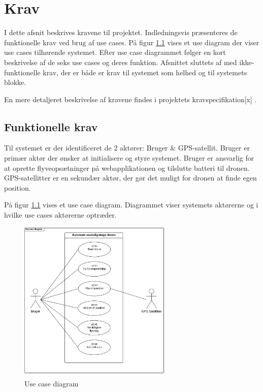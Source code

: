 \chapter{Krav}
\vspace{-0.5cm}
I dette afsnit beskrives kravene til projektet. Indledningsvis præsenteres de funktionelle krav  ved brug af use cases. På figur \ref{fig:useCaseDiagram} vises et use diagram der viser use cases tilhørende systemet. Efter use case diagrammet følger en kort beskrivelse af de seks use cases og deres funktion. Afsnittet sluttets af med ikke-funktionelle krav, der er både er krav til systemet som helhed og til systemets blokke.

En mere detaljeret beskrivelse af kravene findes i projektets kravspecifikation[x] .
\vspace{-0.3cm}

\section{Funktionelle krav}
\vspace{-0.2cm}
Til systemet er der identificeret de 2 aktører: Bruger \& GPS-satellit. Bruger er primær aktør der ønsker at initialisere og styre systemet. Bruger er ansvarlig for at oprette flyveopsætninger på webapplikationen og tilslutte batteri til dronen.
GPS-satellitter er en sekundær aktør, der gør det muligt for dronen at finde egen position. 

På figur \ref{fig:useCaseDiagram} vises et use case diagram. Diagrammet viser systemets aktørerne og i hvilke use cases aktørerne optræder. 
\begin{figure}[H]
	\centering
	\includegraphics[width=0.65\textwidth]{Billeder/Krav/Use_case_diagram}
	\vspace{-0.3cm}	
	\caption{Use case diagram}
	\label{fig:useCaseDiagram}
\end{figure}

